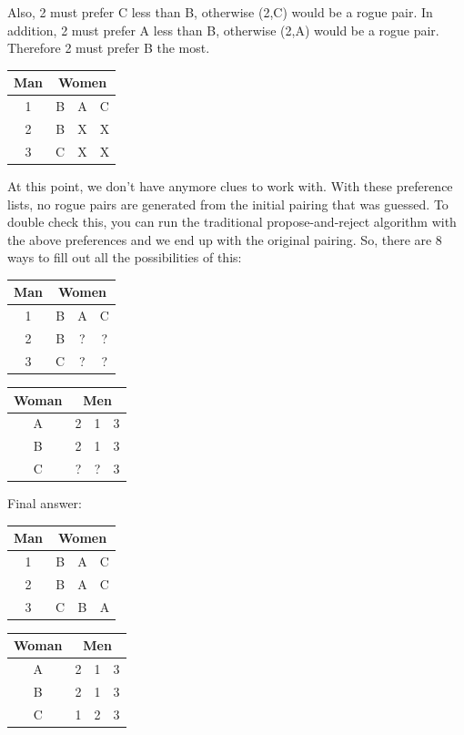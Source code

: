 \documentclass[11pt]{article}
\begin{document}
\begin{qunlist}
\begin{itemize}
{Also, 2 must prefer C less than B, otherwise (2,C) would be a rogue pair. 
In addition, 2 must prefer A less than B, otherwise (2,A) would be a rogue pair. 
Therefore 2 must prefer B the most.

\begin{center}
\begin{tabular}{|c|ccc|}\hline 
Man&\multicolumn{3}{|c|}{Women}\\\hline 
1&B&A&C\\\hline 
2&B&X&X\\\hline 
3&C&X&X\\\hline
\end{tabular} 
\end{center}

At this point, we don't have anymore clues to work with. 
With these preference lists, 
no rogue pairs are generated from the initial pairing that was guessed. 
To double check this, you can run the traditional propose-and-reject algorithm 
with the above preferences and we end up with the original pairing. 
So, there are 8 ways to fill out all the possibilities of this:


\begin{center}
\begin{tabular}{|c|ccc|}\hline 
Man&\multicolumn{3}{|c|}{Women}\\\hline 
1&B&A&C\\\hline 
2&B&?&?\\\hline 
3&C&?&?\\\hline
\end{tabular} 
\hspace{2cm}
\begin{tabular}{|c|ccc|}\hline 
Woman&\multicolumn{3}{|c|}{Men}\\\hline 
A&2&1&3\\\hline 
B&2&1&3\\\hline 
C&?&?&3\\\hline
\end{tabular}
\end{center}


Final answer: 

\begin{center}
\begin{tabular}{|c|ccc|}\hline 
Man&\multicolumn{3}{|c|}{Women}\\\hline 
1&B&A&C\\\hline 
2&B&A&C\\\hline 
3&C&B&A\\\hline
\end{tabular} 
\hspace{2cm}
\begin{tabular}{|c|ccc|}\hline 
Woman&\multicolumn{3}{|c|}{Men}\\\hline 
A&2&1&3\\\hline 
B&2&1&3\\\hline 
C&1&2&3\\\hline
\end{tabular}
\end{center}

}
\end{itemize}
\end{qunlist}
\end{document}
